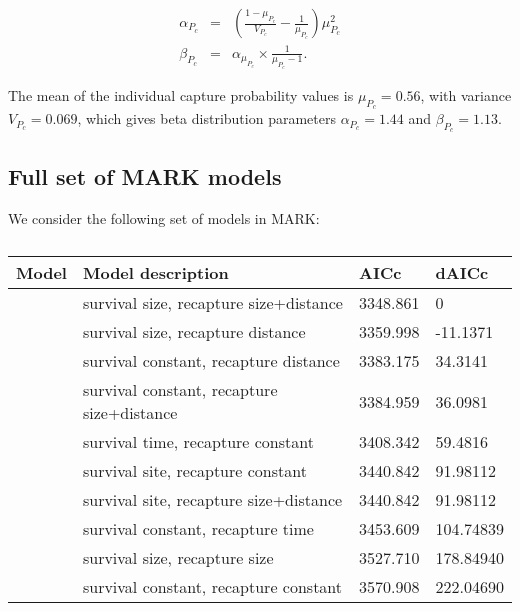 \documentclass[12pt, oneside]{article}   	%
\begin{document}
\begin{eqnarray}
\alpha_{P_c} &=& (\frac{1-\mu_{P_c}}{V_{P_c}} - \frac{1}{\mu_{P_c}}) \mu_{P_c}^2 \\
\beta_{P_c} &=& \alpha_{\mu_{P_c}} \times \frac{1}{\mu_{P_c} - 1}. \label{APP_EQN_ProbCapBetaDistParams}  %
\end{eqnarray}


The mean of the individual capture probability values is $\mu_{P_c} = 0.56$, with variance $V_{P_c} = 0.069$, which gives beta distribution parameters $\alpha_{P_c} = 1.44$ and $\beta_{P_c} = 1.13$. 

\newpage{}

\subsection*{Full set of MARK models} \label{APP_MARKModels}
We consider the following set of models in MARK:
\begin{table}
\begin{centering}
\begin{tabular}{|p{2in}|p{2.5in}|p{0.75in}|p{0.75in}|}
\hline 
\textbf{Model} & \textbf{Model description} & \textbf{AICc} & \textbf{dAICc} \\ \hline
& survival size, recapture size+distance & 3348.861 & 0 \\ \hline
& survival size, recapture distance & 3359.998 & -11.1371 \\ \hline
& survival constant, recapture distance & 3383.175 & 34.3141 \\ \hline
& survival constant, recapture size+distance & 3384.959 & 36.0981 \\ \hline
& survival time, recapture constant & 3408.342 & 59.4816 \\ \hline
& survival site, recapture constant & 3440.842 & 91.98112 \\ \hline
& survival site, recapture size+distance & 3440.842 & 91.98112 \\ \hline
& survival constant, recapture time & 3453.609 & 104.74839 \\ \hline
& survival size, recapture size & 3527.710 & 178.84940 \\ \hline
& survival constant, recapture constant & 3570.908 & 222.04690 \\ \hline
\end{tabular}
\end{centering}
\caption{}\label{APP_TAB_MARKmodels}
\end{table}
\end{document}
